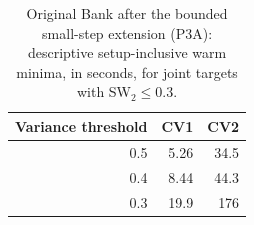 \begin{table}[tb]
\centering\small
\caption{Original Bank after the bounded small-step extension (P3A): descriptive setup-inclusive warm minima, in seconds, for joint targets with SW$_2\leq0.3$.}\label{tab:bank_original_minima}
\begin{tabular}{rrr}
\toprule
Variance threshold & CV1 & CV2 \\
\midrule
0.5 & 5.26 & 34.5 \\
0.4 & 8.44 & 44.3 \\
0.3 & 19.9 & 176 \\
\bottomrule
\end{tabular}
\par{}
\end{table}
